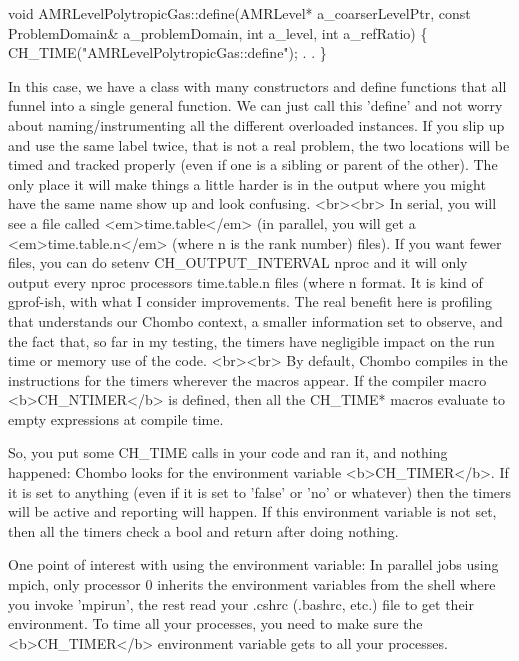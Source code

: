 \begin{DoxyCode}
\textcolor{keywordtype}{void} AMRLevelPolytropicGas::define(AMRLevel*            a\_coarserLevelPtr,
                                   \textcolor{keyword}{const} ProblemDomain& a\_problemDomain,
                                   \textcolor{keywordtype}{int}                  a\_level,
                                   \textcolor{keywordtype}{int}                  a\_refRatio)
\{
   CH\_TIME(\textcolor{stringliteral}{"AMRLevelPolytropicGas::define"});
 .
 .
\}
\end{DoxyCode}
 \begin{DoxyVerb} In this case, we have a class with many constructors and define functions that
 all funnel into a single general function.  We can just call this 'define' and
 not worry about naming/instrumenting all the different overloaded instances. If
 you slip up and use the same label twice, that is not a real problem, the two
 locations will be timed and tracked properly (even if one is a sibling or parent
 of the other). The only place it will make things a little harder is in the output
 where you might have the same name show up and look confusing.
<br><br>
 In serial, you will see a file called <em>time.table</em> (in parallel, you will get a
 <em>time.table.n</em> (where n is the rank number) files).  If
 you want fewer files, you can do 
 setenv CH_OUTPUT_INTERVAL nproc 
 and it will only output every nproc processors time.table.n files
 (where n%
 format.  It is kind of gprof-ish, with what I consider improvements.  The real
 benefit here is profiling that understands our Chombo context, a smaller information
 set to observe, and the fact that, so far in my testing, the timers have negligible
 impact on the run time or memory use of the code.
 <br><br>
 By default, Chombo compiles in the instructions for the timers wherever the macros
 appear.  If the compiler macro <b>CH_NTIMER</b> is defined, then all the CH_TIME* macros
 evaluate to empty expressions at compile time.

 \par So, you put some CH_TIME calls in your code and ran it, and nothing happened:
 Chombo looks for the environment variable <b>CH_TIMER</b>. If it is set to anything (even
 if it is set to 'false' or 'no' or whatever) then the timers will be active and
 reporting will happen.  If this environment variable is not set, then all the timers
 check a bool and return after doing nothing.
 \par
 One point of interest with using the environment variable: In parallel jobs using
 mpich, only processor 0 inherits the environment variables from the shell where
 you invoke 'mpirun', the rest read your .cshrc (.bashrc, etc.) file to get their
 environment.  To time all your processes, you need to make sure the <b>CH_TIMER</b>
 environment variable gets to all your processes.




\end{DoxyVerb}
